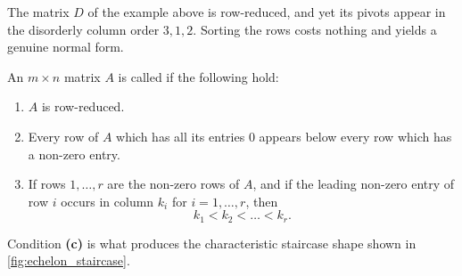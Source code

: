 The matrix $D$ of the example above is row-reduced, and yet its pivots appear in the disorderly column order $3, 1, 2$. Sorting the rows costs nothing and yields a genuine normal form.

\begin{definition}
\label{def:row_reduced_echelon}
An $m \times n$ matrix $A$ is called  if the following hold:
\begin{enumerate}[label=\textbf{(\alph*)}]
    \item $A$ is row-reduced.
    \item Every row of $A$ which has all its entries $0$ appears below every row which has a non-zero entry.
    \item If rows $1, \dots, r$ are the non-zero rows of $A$, and if the leading non-zero entry of row $i$ occurs in column $k_i$ for $i = 1, \dots, r$, then
    \[
    k_1 < k_2 < \dots < k_r.
    \]
\end{enumerate}
\end{definition}

Condition \textbf{(c)} is what produces the characteristic staircase shape shown in \cref{fig:echelon_staircase}.

